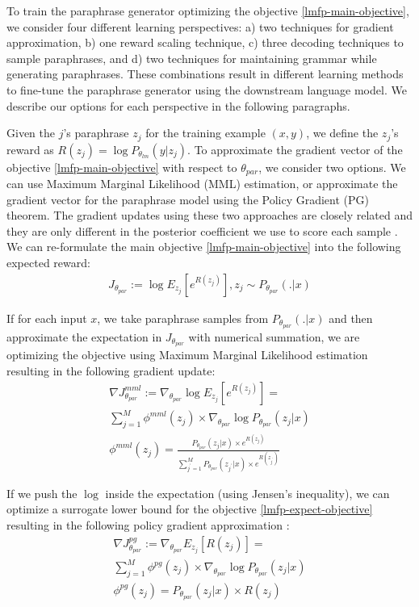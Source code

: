 \documentclass[11pt]{article}
\begin{document}
To train the paraphrase generator optimizing the objective \ref{lmfp-main-objective}, we consider four different learning perspectives: a) two techniques for gradient approximation, b) one reward scaling technique, c) three decoding techniques to sample paraphrases, and d) two techniques for maintaining grammar while generating paraphrases. These combinations result in different learning methods to fine-tune the paraphrase generator using the downstream language model. We describe our options for each perspective in the following paragraphs.

Given the $j$'s paraphrase $z_{j}$ for the training example $(x, y)$, we define the $z_{j}$'s reward as $R(z_{j}) = \log P_{\theta_{lm}} (y | z_{j})$.
To approximate the gradient vector of the objective \ref{lmfp-main-objective} with respect to $\theta_{par}$, we consider two options. We can use Maximum Marginal Likelihood (MML) estimation, or approximate the gradient vector for the paraphrase model using the Policy Gradient (PG) theorem. The gradient updates using these two approaches are closely related and they are only different in the posterior coefficient we use to score each sample \cite{guu-etal-2017-language}. We can re-formulate the main objective \ref{lmfp-main-objective} into the following expected reward:
\begin{multline}
J_{\theta_{par}} 
:= \log E_{z_{j}} [e^{R(z_{j})}],
z_{j} \sim P_{\theta_{par}}(.|x)
\label{lmfp-expect-objective}
\end{multline}

If for each input $x$, we take paraphrase samples from $P_{\theta_{par}}(.|x)$ and then approximate the expectation in $J_{\theta_{par}}$ with numerical summation, we are optimizing the objective using Maximum Marginal Likelihood estimation resulting in the following gradient update:
\begin{multline}
\nabla J^{mml}_{\theta_{par}} :=  \nabla_{\theta_{par}} \log E_{z_{j}} [e^{R(z_{j})}] = \\
\sum^{M}_{j=1} \phi^{mml}(z_{j}) \times \nabla_{\theta_{par}} \log P_{\theta_{par}}(z_{j}|x) \\
\phi^{mml}(z_{j}) = \frac{P_{\theta_{par}}(z_{j}|x) \times e^{R(z_{j})}}{\sum^{M}_{j^{'}=1} P_{\theta_{par}}(z_{j^{'}}|x) \times e^{R(z_{j^{'}})}}
\label{mml-objective}
\end{multline}

If we push the $\log$ inside the expectation (using Jensen's inequality), we can optimize a surrogate lower bound for the objective \ref{lmfp-expect-objective} resulting in the following policy gradient approximation \cite{10.5555/3009657.3009806}:
\begin{multline}
\nabla J^{pg}_{\theta_{par}} := \nabla_{\theta_{par}} E_{z_{j}} [R(z_{j})] = \\
\sum^{M}_{j=1} \phi^{pg}(z_{j}) \times \nabla_{\theta_{par}} \log P_{\theta_{par}}(z_{j}|x) \\
\phi^{pg}(z_{j}) = P_{\theta_{par}}(z_{j}|x) \times R(z_{j})
\label{pg-objective}
\end{multline}
\end{document}
